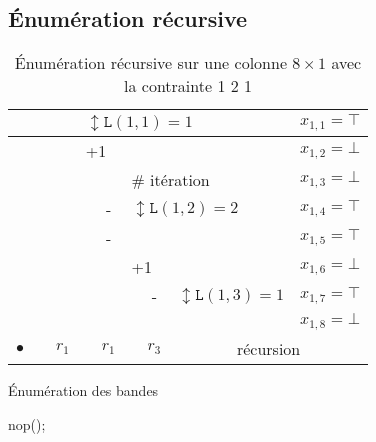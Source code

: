 \documentclass[a4paper,12pt]{report}
\newcommand\black{\cellcolor{black}}
\newcommand\grey{\cellcolor{black!50}}
\begin{document}
\subsection{Énumération récursive}
\begin{table}[H]
\centering
\begin{tabular}{|c|c|c|l|c|l|c|c|c|}
\hline 
\grey &&\black & \multicolumn{5}{l|}{$\updownarrow \mathtt{L}(1,1) = 1$}& $x_{1,1}=\top$ \\ 
\hline 
\grey && & \multicolumn{5}{l|}{+1} & $x_{1,2}=\bot$ \\ 
\hline
\grey &&\grey &  &  & \multicolumn{3}{l|}{$\#$ itération}& $x_{1,3}=\bot$ \\ 
\hline 
\grey &&\grey &  & \black - & \multicolumn{3}{l|}{$\updownarrow \mathtt{L}(1,2) = 2$}& $x_{1,4}=\top$ \\ 
\cline{1-5}\cline{9-9}
\grey &&\grey &  & \black - & \multicolumn{3}{l|}{}& $x_{1,5}=\top$\\ 
\hline 
\grey &&\grey &  &  & \multicolumn{3}{l|}{+1} & $x_{1,6}=\bot$\\ 
\hline 
\grey &&\grey &  & \grey &  & \black - & $\updownarrow \mathtt{L}(1,3) = 1$ & $x_{1,7}=\top$ \\ 
\hline 
\grey &&\grey &  & \grey &  &  &  & $x_{1,8}=\bot$\\ 
\hline
\hline 
 $\bullet$&&$r_1$ &  & $r_1$ &  &$r_3$&  \multicolumn{2}{c|}{récursion}\\
\hline
\end{tabular}
\caption{\label{EnumBande} Énumération récursive sur une colonne $8\times1$ avec la contrainte 1 2 1}
\end{table}

 
\begin{algorithm}
\caption{Énumération des bandes}
\begin{algorithmic}
		nop();		
		\EndFor			
\EndFor
\end{algorithmic}
\end{algorithm}

	
						
\end{document}
